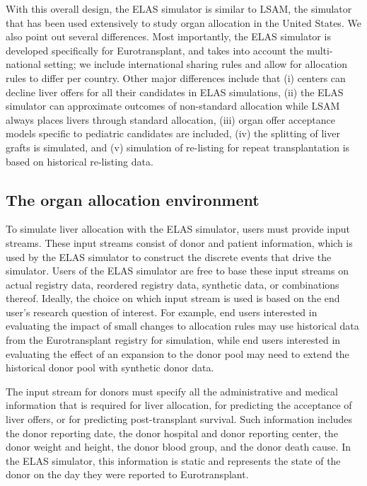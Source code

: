 \documentclass[11pt,twoside,]{book}
\begin{document}
With this overall design, the ELAS simulator is similar to LSAM, the simulator that
has been used extensively to study organ allocation in the United
States. We also point out several differences. Most importantly, the
ELAS simulator is developed specifically for Eurotransplant, and takes
into account the multi-national setting; we include international
sharing rules and allow for allocation rules to differ per country.
Other major differences include that (i) centers can decline
liver offers for all their candidates in ELAS simulations, (ii) the ELAS simulator can
approximate outcomes of non-standard allocation while LSAM always places
livers through standard allocation, (iii) organ offer acceptance models specific
to pediatric candidates are included, (iv) the splitting of liver grafts is
simulated, and (v) simulation of re-listing for repeat transplantation is
based on historical re-listing data.

\subsection{The organ allocation environment}\label{sec:elasenvironment}

To simulate liver allocation with the ELAS simulator, users must provide input
streams. These input streams consist of donor and patient information, which is
used by the ELAS simulator to construct the discrete events that drive the simulator.
Users of the ELAS simulator are free to base these input streams on actual
registry data, reordered registry data, synthetic data, or combinations
thereof. Ideally, the choice on which input stream is used is based on the end user's research question of interest. For example, end users
interested in evaluating the impact of small changes to allocation rules
may use historical data from the Eurotransplant registry for simulation,
while end users interested in evaluating the effect of an expansion to
the donor pool may need to extend the historical donor pool with synthetic
donor data.

The input stream for donors must specify all the administrative and medical information
that is required for liver allocation, for predicting the acceptance of liver offers,
or for predicting post-transplant survival. Such information includes the
donor reporting date, the donor hospital and donor reporting center, the donor weight
and height, the donor blood group, and the donor death cause. In the ELAS simulator,
this information is static and represents the state of the donor on the day they
were reported to Eurotransplant.
\end{document}
